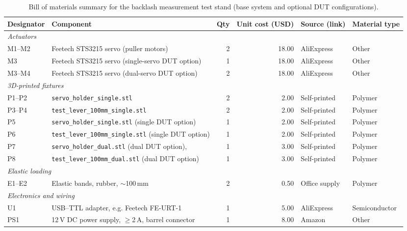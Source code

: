 \documentclass[11pt,letterpaper]{article}
\begin{document}
\begin{table}[H]
\centering
\caption{Bill of materials summary for the backlash measurement test stand (base system and optional DUT configurations).}
\label{tab:bom_summary}
\small
\begin{tabular}{llrrll}
\toprule
\textbf{Designator} & \textbf{Component} & \textbf{Qty} & \textbf{Unit cost (USD)} & \textbf{Source (link)} & \textbf{Material type} \\
\midrule

\multicolumn{6}{l}{\textit{Actuators}} \\
M1--M2 & Feetech STS3215 servo (puller motors) & 2 & 18.00 & AliExpress\footnotemark[1] & Other \\
M3    & Feetech STS3215 servo (single-servo DUT option) & 1 & 18.00 & AliExpress\footnotemark[1] & Other \\
M3--M4 & Feetech STS3215 servo (dual-servo DUT option) & 2 & 18.00 & AliExpress\footnotemark[1] & Other \\
\midrule

\multicolumn{6}{l}{\textit{3D-printed fixtures}} \\
P1--P2 & \texttt{servo\_holder\_single.stl}  & 2 & 2.00 & Self-printed & Polymer \\
P3--P4 & \texttt{test\_lever\_100mm\_single.stl} & 2 & 2.00 & Self-printed & Polymer \\
P5     & \texttt{servo\_holder\_single.stl} (single DUT option) & 1 & 2.00 & Self-printed & Polymer \\
P6     & \texttt{test\_lever\_100mm\_single.stl} (single DUT option) & 1 & 2.00 & Self-printed & Polymer \\
P7     & \texttt{servo\_holder\_dual.stl} (dual DUT option),  & 1 & 3.00 & Self-printed & Polymer \\
P8     & \texttt{test\_lever\_100mm\_dual.stl} (dual DUT option) & 1 & 3.00 & Self-printed & Polymer \\
\midrule

\multicolumn{6}{l}{\textit{Elastic loading}} \\
E1--E2 & Elastic bands, rubber, $\sim$100\,mm & 2 & 0.50 & Office supply\footnotemark[2] & Polymer \\
\midrule

\multicolumn{6}{l}{\textit{Electronics and wiring}} \\
U1 & USB--TTL adapter, e.g. Feetech FE-URT-1 & 1 & 5.00 & AliExpress\footnotemark[3] & Semiconductor \\
PS1 & 12\,V DC power supply, $\ge$2\,A, barrel connector & 1 & 8.00 & Amazon\footnotemark[4] & Other \\
\midrule


\end{tabular}
\end{table}
\end{document}
